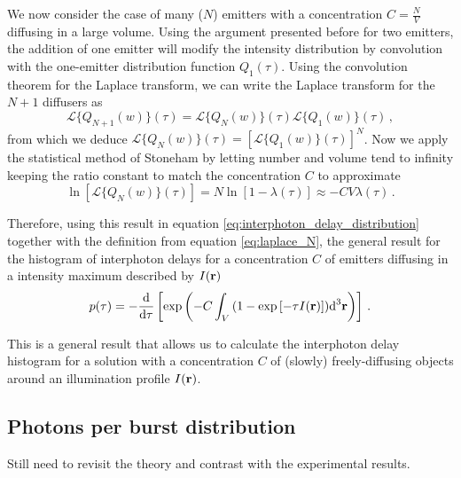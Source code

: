 We now consider the case of many ($N$) emitters with a concentration $C=\frac{N}{V}$
 diffusing in a large volume. Using the argument presented before for two emitters, 
the addition of one emitter will modify the intensity distribution by convolution 
with the one-emitter distribution function $Q_1(\tau)$. Using the convolution theorem 
for the Laplace transform, we can write the Laplace transform for the $N+1$ diffusers as
\begin{equation}
\mathscr{L}\{Q_{N+1}(w)\}(\tau) = \mathscr{L}\{Q_N(w)\}(\tau) \mathscr{L}\{Q_1(w)\}(\tau)\,,
\label{eq:laplace_N}
\end{equation}
from which we deduce 
$\mathscr{L}\{Q_{N}(w)\}(\tau)=\left[\mathscr{L}\{Q_{1}(w)\}(\tau)\right]^N $. 
Now we apply the statistical method of Stoneham \cite{STONEHAM1969, Fleury1995} 
by letting number and volume tend to infinity keeping the ratio constant to match 
the concentration $C$ to approximate
\begin{equation}
\ln\left[\mathscr{L}\{Q_{N}(w)\}(\tau)\right] = 
N\ln\left[1-\lambda(\tau)\right] \approx - C V \lambda(\tau)\,.
\label{eq:stoneham_approx}
\end{equation}

Therefore, using this result in equation \ref{eq:interphoton_delay_distribution} 
together with the definition from equation \ref{eq:laplace_N}, the general result 
for the histogram of interphoton delays for a concentration $C$ of emitters diffusing 
in a intensity maximum described by $I({\mathbf{r}})$ 
\begin{equation}
p(\tau)=-\frac{\mbox{d}}{\mbox{d}\tau}\left[ 
\exp\left(-C \int_V{\left(1-\exp\left[-\tau I({\mathbf{r}})\right] \right)}
\mbox{d}^3{\mathbf{r}}    \right)\right]\,.
\label{eq:result}
\end{equation}

This is a general result that allows us to calculate the interphoton 
delay histogram  for a solution with a concentration $C$ of (slowly) 
freely-diffusing objects around an illumination profile $I({\mathbf{r}})$. 

\subsection{Photons per burst distribution}

Still need to revisit the theory and contrast with the experimental results.

%

